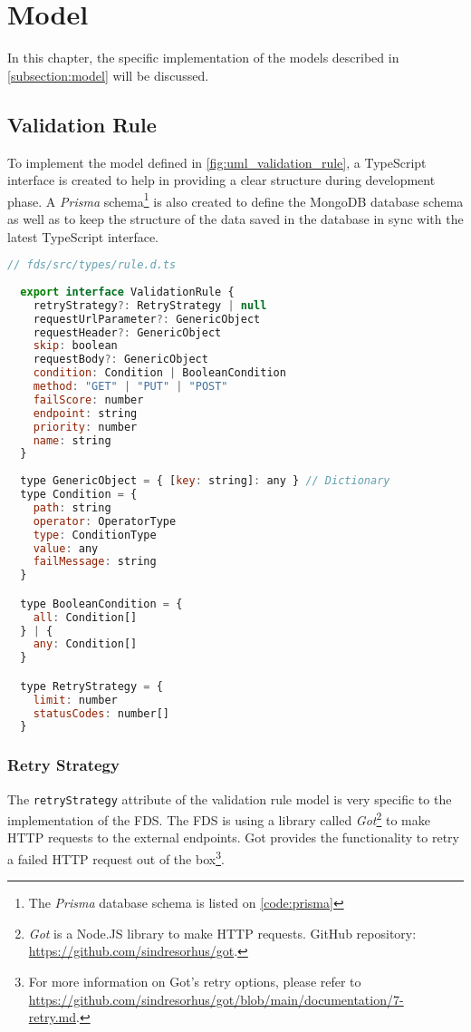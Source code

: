 \section{Model}

In this chapter, the specific implementation of the models described in \autoref{subsection:model} will be discussed. 

 \subsection{Validation Rule}
  To implement the model defined in \autoref{fig:uml_validation_rule}, a TypeScript interface is created to help in providing a clear structure during development phase. A \emph{Prisma} schema\footnote{The \emph{Prisma} database schema is listed on \autoref{code:prisma}} is also created to define the MongoDB database schema as well as to keep the structure of the data saved in the database in sync with the latest TypeScript interface. 

  \begin{lstlisting}[caption={TypeScript interface of a validation rule (TypeScript)}, language=js]
  // fds/src/types/rule.d.ts
  
  export interface ValidationRule {
    retryStrategy?: RetryStrategy | null
    requestUrlParameter?: GenericObject
    requestHeader?: GenericObject
    skip: boolean
    requestBody?: GenericObject
    condition: Condition | BooleanCondition
    method: "GET" | "PUT" | "POST" 
    failScore: number
    endpoint: string
    priority: number
    name: string
  }
  
  type GenericObject = { [key: string]: any } // Dictionary
  type Condition = {
    path: string
    operator: OperatorType
    type: ConditionType
    value: any
    failMessage: string
  }

  type BooleanCondition = {
    all: Condition[]
  } | {
    any: Condition[]
  }

  type RetryStrategy = {
    limit: number
    statusCodes: number[] 
  }
  \end{lstlisting}
 
 \subsubsection{Retry Strategy}
  The \verb;retryStrategy; attribute of the validation rule model is very specific to the implementation of the FDS. The FDS is using a library called \emph{Got}\footnote{\emph{Got} is a Node.JS library to make HTTP requests. GitHub repository: \url{https://github.com/sindresorhus/got}.} to make HTTP requests to the external endpoints. Got provides the functionality to retry a failed HTTP request out of the box\footnote{For more information on Got's retry options, please refer to \url{https://github.com/sindresorhus/got/blob/main/documentation/7-retry.md}.}.

